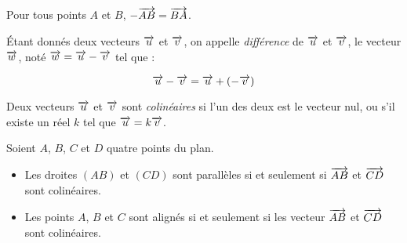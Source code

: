 \begin{propriete}
  Pour tous points $A$ et $B$, $-\overrightarrow{AB}=\overrightarrow{BA}$.
\end{propriete}

\begin{definition}
  Étant donnés deux vecteurs $\overrightarrow{u}$ et $\overrightarrow{v}$, on appelle
  \emph{différence} de $\overrightarrow{u}$ et $\overrightarrow{v}$, le vecteur $\overrightarrow{w}$, noté \emph{$\overrightarrow{w}=\overrightarrow{u}-\overrightarrow{v}$} tel que :

  \[\overrightarrow{u}-\overrightarrow{v}=\overrightarrow{u} + (-\overrightarrow{v})\]
\end{definition}

\begin{definition}
  Deux vecteurs $\overrightarrow{u}$ et $\overrightarrow{v}$ sont \emph{colinéaires} si l'un des deux est le vecteur nul, ou s'il existe un réel $k$ tel que $\overrightarrow{u}=k\overrightarrow{v}$.
\end{definition}

\begin{propriete}
  Soient $A$, $B$, $C$ et $D$ quatre points du plan.
  \begin{itemize}
    \item Les droites $(AB)$ et $(CD)$ sont parallèles si et seulement si $\overrightarrow{AB}$ et $\overrightarrow{CD}$ sont colinéaires.
    \item Les points $A$, $B$ et $C$ sont alignés si et seulement si les vecteur $\overrightarrow{AB}$ et $\overrightarrow{CD}$ sont colinéaires.
  \end{itemize}
\end{propriete}
